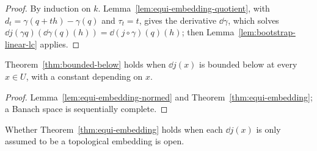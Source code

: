 \begin{proof}
  \leanok
  By induction on $k$. Lemma~\ref{lem:equi-embedding-quotient}, with
  $d_t = \gamma(q + th) - \gamma(q)$ and $\tau_t = t$, gives the derivative $\dd\gamma$, which
  solves $\dd j(\gamma q)(\dd\gamma(q)(h)) = \dd(j \circ \gamma)(q)(h)$; then
  Lemma~\ref{lem:bootstrap-linear-lc} applies.
\end{proof}

\begin{corollary}
  \label{cor:bounded-below-pointwise}
  \leanok
  Theorem~\ref{thm:bounded-below} holds when $\dd j(x)$ is bounded below at every $x \in U$, with
  a constant depending on $x$.
\end{corollary}

\begin{proof}
  \leanok
  Lemma~\ref{lem:equi-embedding-normed} and Theorem~\ref{thm:equi-embedding}; a Banach space is
  sequentially complete.
\end{proof}

Whether Theorem~\ref{thm:equi-embedding} holds when each $\dd j(x)$ is only assumed to be a
topological embedding is open.
